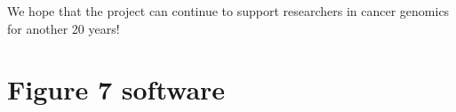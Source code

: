 \documentclass[graybox]{svmult}
\begin{document}
We hope that the project can continue to support researchers in cancer
genomics for another 20 years!

%



%

\pagebreak



\section{Figure 7 software}\label{app3}
\end{document}
